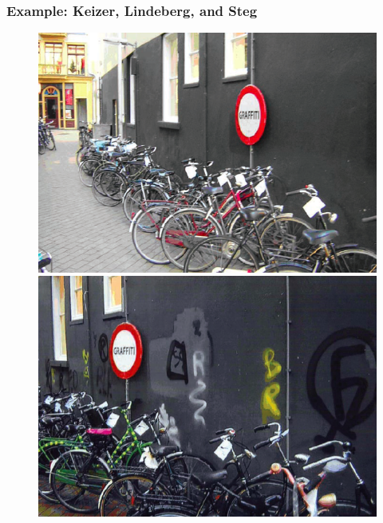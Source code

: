 \documentclass[12pt,english,dvipsnames,aspectratio=169,handout]{beamer}\usepackage[]{graphicx}\usepackage[]{xcolor}
\begin{document}
\begin{frame}
	\frametitle{Example: Keizer, Lindeberg, and Steg \citeyear{keizer_spreading_2008}}
    \begin{figure}[ht]
        \begin{minipage}[b]{0.45\linewidth}
            \centering
            \includegraphics[width=\textwidth]{../04-figures/12/11-w12_disorder1}
        \end{minipage}
        \hspace{0.5cm}
        \begin{minipage}[b]{0.45\linewidth}
            \centering
            \includegraphics[width=\textwidth]{../04-figures/12/12-w12_disorder12}
        \end{minipage}
    \end{figure}
\end{frame}
\end{document}
